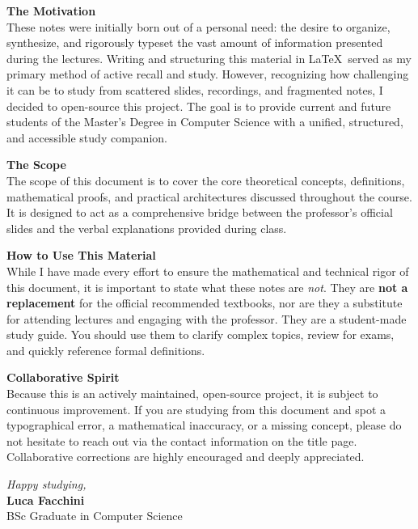 
\noindent \textbf{The Motivation}\\
These notes were initially born out of a personal need: the desire to organize, synthesize, and rigorously typeset the vast amount of information presented during the lectures. Writing and structuring this material in \LaTeX\ served as my primary method of active recall and study. However, recognizing how challenging it can be to study from scattered slides, recordings, and fragmented notes, I decided to open-source this project. The goal is to provide current and future students of the Master's Degree in Computer Science with a unified, structured, and accessible study companion.

\vspace{1em}
\noindent \textbf{The Scope}\\
The scope of this document is to cover the core theoretical concepts, definitions, mathematical proofs, and practical architectures discussed throughout the course. It is designed to act as a comprehensive bridge between the professor's official slides and the verbal explanations provided during class. 

\vspace{1em}
\noindent \textbf{How to Use This Material}\\
While I have made every effort to ensure the mathematical and technical rigor of this document, it is important to state what these notes are \textit{not}. They are \textbf{not a replacement} for the official recommended textbooks, nor are they a substitute for attending lectures and engaging with the professor. They are a student-made study guide. You should use them to clarify complex topics, review for exams, and quickly reference formal definitions.

\vspace{1em}
\noindent \textbf{Collaborative Spirit}\\
Because this is an actively maintained, open-source project, it is subject to continuous improvement. If you are studying from this document and spot a typographical error, a mathematical inaccuracy, or a missing concept, please do not hesitate to reach out via the contact information on the title page. Collaborative corrections are highly encouraged and deeply appreciated.

\vspace{2em}
\noindent \textit{Happy studying,}\\
\textbf{Luca Facchini}\\
BSc Graduate in Computer Science
